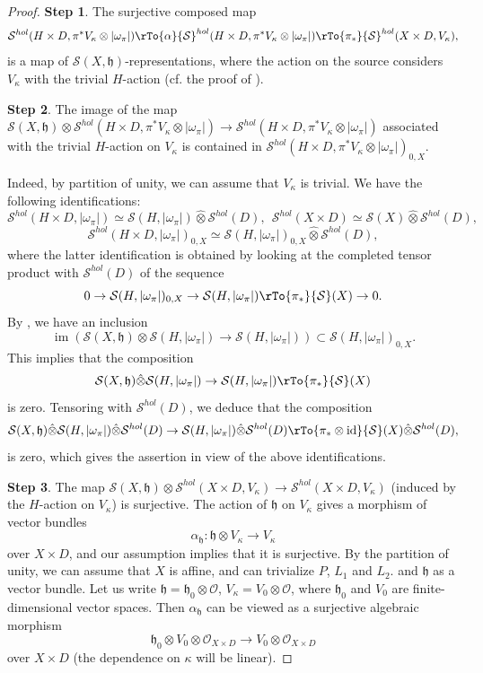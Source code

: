 \documentclass[12pt,reqno]{amsart}
\theoremstyle{definition}
\theoremstyle{remark}
\numberwithin{equation}{section}
\newcommand{\ot}{\otimes}
\renewcommand{\SS}{{\mathcal S}}
\newcommand{\OO}{{\mathcal O}}
\newcommand{\sub}{\subset}
\newcommand{\im}{\operatorname{im}}
\newcommand{\om}{\omega}
\renewcommand{\a}{\alpha}
\newcommand{\id}{\operatorname{id}}
\newcommand{\fh}{{\mathfrak h}}
\begin{document}
\begin{proof}
{\bf Step 1}. The surjective composed map 
$$\SS^{hol}(H\times D,\pi^*V_{\kappa}\ot |\om_\pi|)\rTo{\a}\SS^{hol}(H\times D,\pi^*V_{\kappa}\ot |\om_\pi|)\rTo{\pi_*}\SS^{hol}(X\times D,V_{\kappa}),$$
is a map of $\SS(X,\fh)$-representations, where the action on the source considers $V_{\kappa}$ with the trivial $H$-action (cf. the proof of \cite[Cor.\ 9.17]{AG-sm-tr}).

\noindent
{\bf Step 2}. The image of the map $\SS(X,\fh)\ot \SS^{hol}(H\times D,\pi^*V_{\kappa}\ot |\om_\pi|)\to \SS^{hol}(H\times D,\pi^*V_{\kappa}\ot |\om_\pi|)$
associated with the trivial $H$-action on $V_{\kappa}$ is contained in $\SS^{hol}(H\times D,\pi^*V_{\kappa}\ot |\om_\pi|)_{0,X}$.

Indeed, by partition of unity, we can assume that $V_{\kappa}$ is trivial. We have the following identifications:
$$\SS^{hol}(H\times D,|\om_\pi|)\simeq \SS(H,|\om_\pi|)\hat{\ot} \SS^{hol}(D), \ \ \SS^{hol}(X\times D)\simeq \SS(X)\hat{\ot} \SS^{hol}(D),$$
$$\SS^{hol}(H\times D,|\om_\pi|)_{0,X}\simeq \SS(H,|\om_\pi|)_{0,X}\hat{\ot} \SS^{hol}(D),$$
where the latter identification is obtained by looking at the completed tensor product with $\SS^{hol}(D)$ of the sequence
$$0\to \SS(H,|\om_\pi|)_{0,X}\to \SS(H,|\om_\pi|)\rTo{\pi_*}\SS(X)\to 0.$$
By \cite[Lem.\ B.1.14]{AG-sm-tr}, we have an inclusion
$$\im(\SS(X,\fh)\ot \SS(H,|\om_\pi|)\to \SS(H,|\om_\pi|))\sub \SS(H,|\om_\pi|)_{0,X}.$$
This implies that the composition
$$\SS(X,\fh)\hat{\ot} \SS(H,|\om_\pi|)\to \SS(H,|\om_\pi|)\rTo{\pi_*}\SS(X)$$
is zero. Tensoring with $\SS^{hol}(D)$, we deduce that the composition
$$\SS(X,\fh)\hat{\ot} \SS(H,|\om_\pi|)\hat{\ot} \SS^{hol}(D)\to \SS(H,|\om_\pi|)\hat{\ot} \SS^{hol}(D) \rTo{\pi_*\ot \id}\SS(X)\hat{\ot} \SS^{hol}(D),$$
is zero, which gives the assertion in view of the above identifications.

\noindent
{\bf Step 3}. The map $\SS(X,\fh)\ot \SS^{hol}(X\times D,V_{\kappa})\to \SS^{hol}(X\times D,V_{\kappa})$ (induced by the $H$-action on $V_{\kappa}$) is surjective.
The action of $\fh$ on $V_{\kappa}$ gives a morphism of vector bundles
$$\a_{\fh}:\fh\ot V_{\kappa}\to V_{\kappa}$$
over $X\times D$, and our assumption implies that it is surjective. By the partition of unity, we can assume that $X$ is affine, and can trivialize $P$, $L_1$ and $L_2$.
and $\fh$ as a vector bundle. Let us write $\fh=\fh_0\ot \OO$, $V_{\kappa}=V_0\ot \OO$, where $\fh_0$ and $V_0$ are finite-dimensional vector spaces.
Then $\a_{\fh}$ can be viewed as a surjective algebraic morphism 
$$\fh_0\ot V_0\ot \OO_{X\times D}\to V_0\ot \OO_{X\times D}$$ 
over $X\times D$ (the dependence on $\kappa$ will be linear). 


\end{proof}
\end{document}

